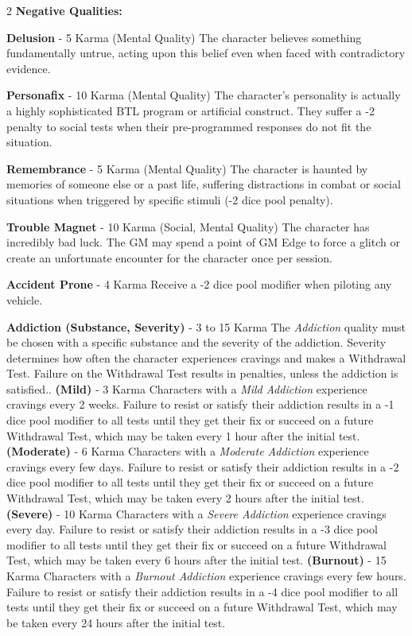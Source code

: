 \documentclass[
  oneside]{article}
\begin{document}
\begin{multicols}{2}
\textbf{Negative Qualities:}

\textbf{Delusion} - 5 Karma (Mental Quality) The
character believes something fundamentally untrue,
acting upon this belief even when faced with
contradictory evidence.

\textbf{Personafix} - 10 Karma (Mental Quality)
The character's personality is actually a highly
sophisticated BTL program or artificial construct.
They suffer a -2 penalty to social tests when
their pre-programmed responses do not fit the
situation.

\textbf{Remembrance} - 5 Karma (Mental Quality)
The character is haunted by memories of someone
else or a past life, suffering distractions in
combat or social situations when triggered by
specific stimuli (-2 dice pool penalty).

\textbf{Trouble Magnet} - 10 Karma (Social, Mental
Quality) The character has incredibly bad luck.
The GM may spend a point of GM Edge to force a
glitch or create an unfortunate encounter for the
character once per session.

\textbf{Accident Prone} - 4 Karma Receive a -2
dice pool modifier when piloting any vehicle.

\textbf{Addiction (Substance, Severity)} - 3 to 15
Karma The \emph{Addiction} quality must be chosen
with a specific substance and the severity of the
addiction. Severity determines how often the
character experiences cravings and makes a
Withdrawal Test. Failure on the Withdrawal Test
results in penalties, unless the addiction is
satisfied.. \textbf{(Mild)} - 3 Karma Characters
with a \emph{Mild} \emph{Addiction} experience
cravings every 2 weeks. Failure to resist or
satisfy their addiction results in a -1 dice pool
modifier to all tests until they get their fix or
succeed on a future Withdrawal Test, which may be
taken every 1 hour after the initial test.
\textbf{(Moderate)} - 6 Karma Characters with a
\emph{Moderate Addiction} experience cravings
every few days. Failure to resist or satisfy their
addiction results in a -2 dice pool modifier to
all tests until they get their fix or succeed on a
future Withdrawal Test, which may be taken every 2
hours after the initial test. \textbf{(Severe)} -
10 Karma Characters with a \emph{Severe Addiction}
experience cravings every day. Failure to resist
or satisfy their addiction results in a -3 dice
pool modifier to all tests until they get their
fix or succeed on a future Withdrawal Test, which
may be taken every 6 hours after the initial test.
\textbf{(Burnout)} - 15 Karma Characters with a
\emph{Burnout Addiction} experience cravings every
few hours. Failure to resist or satisfy their
addiction results in a -4 dice pool modifier to
all tests until they get their fix or succeed on a
future Withdrawal Test, which may be taken every
24 hours after the initial test.


\end{multicols}
\end{document}
